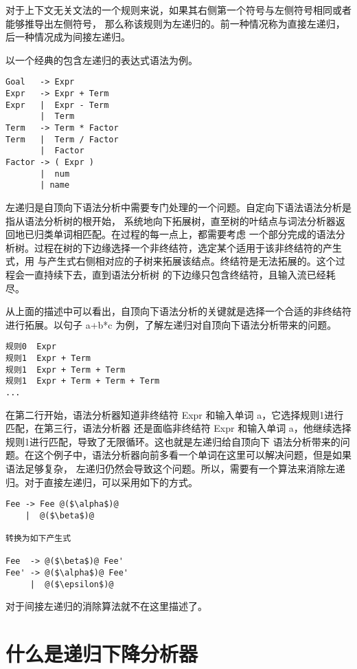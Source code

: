 对于上下文无关文法的一个规则来说，如果其右侧第一个符号与左侧符号相同或者能够推导出左侧符号，
那么称该规则为左递归的。前一种情况称为直接左递归，后一种情况成为间接左递归。



以一个经典的包含左递归的表达式语法为例。

\begin{lstlisting}[caption={经典表达式文法}]
Goal   -> Expr
Expr   -> Expr + Term
Expr   |  Expr - Term
       |  Term
Term   -> Term * Factor
Term   |  Term / Factor
       |  Factor
Factor -> ( Expr )
       |  num
       | name
\end{lstlisting}

左递归是自顶向下语法分析中需要专门处理的一个问题。自定向下语法语法分析是指从语法分析树的根开始，
系统地向下拓展树，直至树的叶结点与词法分析器返回地已归类单词相匹配。在过程的每一点上，都需要考虑
一个部分完成的语法分析树。过程在树的下边缘选择一个非终结符，选定某个适用于该非终结符的产生式，用
与产生式右侧相对应的子树来拓展该结点。终结符是无法拓展的。这个过程会一直持续下去，直到语法分析树
的下边缘只包含终结符，且输入流已经耗尽。

从上面的描述中可以看出，自顶向下语法分析的关键就是选择一个合适的非终结符进行拓展。以句子
a+b*c 为例，了解左递归对自顶向下语法分析带来的问题。

\begin{lstlisting}[caption={自顶向下语法分析 a+b*c}]
规则0  Expr
规则1  Expr + Term
规则1  Expr + Term + Term
规则1  Expr + Term + Term + Term
...
\end{lstlisting}

在第二行开始，语法分析器知道非终结符 Expr 和输入单词 a，它选择规则1进行匹配，在第三行，语法分析器
还是面临非终结符 Expr 和输入单词 a，他继续选择规则1进行匹配，导致了无限循环。这也就是左递归给自顶向下
语法分析带来的问题。在这个例子中，语法分析器向前多看一个单词在这里可以解决问题，但是如果语法足够复杂，
左递归仍然会导致这个问题。所以，需要有一个算法来消除左递归。对于直接左递归，可以采用如下的方式。

\begin{lstlisting}[caption={消除直接左递归}]
Fee -> Fee @($\alpha$)@
    |  @($\beta$)@
    
转换为如下产生式

Fee  -> @($\beta$)@ Fee'
Fee' -> @($\alpha$)@ Fee'
     |  @($\epsilon$)@
\end{lstlisting}

对于间接左递归的消除算法就不在这里描述了。

\section*{什么是递归下降分析器}
